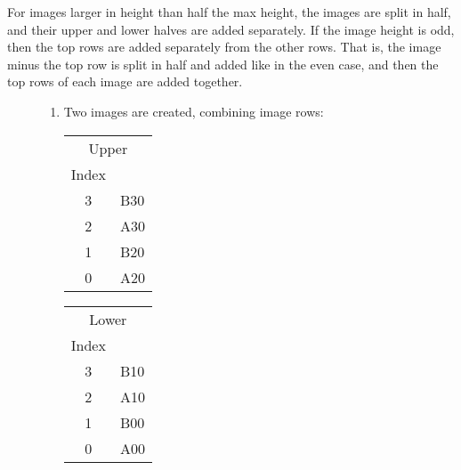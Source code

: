 \documentclass[12pt]{report}
\begin{document}
For images larger in height than half the max height, the images
are split in half, and their upper and lower halves are added
separately. If the image height is odd, then the top rows are
added separately from the other rows. That is, the image minus the
top row is split in half and added like in the even case, and then
the top rows of each image are added together.
\begin{figure}[H]
\begin{mdframed}[style=default]
\begin{enumerate}
\item Two images are created, combining image rows:
\begin{center}
\begin{tabular}{cl}
\multicolumn{2}{c}{Upper}\\
Index &\ \\
\hline
3 & B30\\
2 & A30\\
1 & B20\\
0 & A20\\
\end{tabular}
\end{center}
\begin{center}
\begin{tabular}{cl}
\multicolumn{2}{c}{Lower}\\
Index &\ \\
\hline
3 & B10\\
2 & A10\\
1 & B00\\
0 & A00\\
\end{tabular}
\end{center}


\end{enumerate}
\end{mdframed}
\end{figure}
\end{document}
